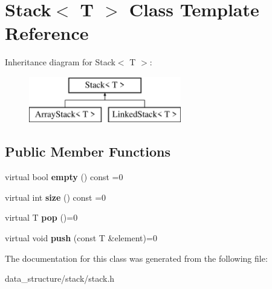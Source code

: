 \hypertarget{classStack}{}\section{Stack$<$ T $>$ Class Template Reference}
\label{classStack}
Inheritance diagram for Stack$<$ T $>$\+:\begin{figure}[H]
\begin{center}
\leavevmode
\includegraphics[height=2.000000cm]{classStack}
\end{center}
\end{figure}
\subsection*{Public Member Functions}
\begin{DoxyCompactItemize}
\item 
\mbox{\label{classStack_afbfc6378d9b9381137f0dd59943c8eae}} 
virtual bool {\bfseries empty} () const =0
\item 
\mbox{\label{classStack_a476b1b8ab66ea042d669eebdc81568ec}} 
virtual int {\bfseries size} () const =0
\item 
\mbox{\label{classStack_afae3a6ed7acb65919b802991ccbdd4cd}} 
virtual T {\bfseries pop} ()=0
\item 
\mbox{\label{classStack_a5fde93daf38b1c1579c208ed411e664c}} 
virtual void {\bfseries push} (const T \&element)=0
\end{DoxyCompactItemize}


The documentation for this class was generated from the following file\+:\begin{DoxyCompactItemize}
\item 
data\+\_\+structure/stack/stack.\+h\end{DoxyCompactItemize}
